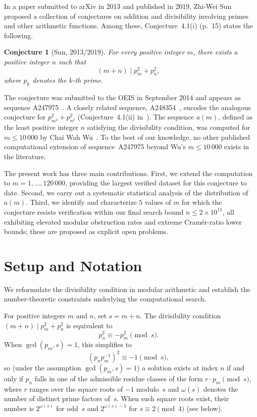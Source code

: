 \documentclass[pdflatex,sn-mathphys-num,Numbered]{sn-jnl}
\theoremstyle{thmstyleone}
\newtheorem{conjecture}[theorem]{Conjecture}
\theoremstyle{thmstylethree}
\theoremstyle{thmstyletwo}
\numberwithin{equation}{section}
\begin{document}
In a paper submitted to arXiv in 2013 and published in 2019,
Zhi-Wei Sun~\cite{Sun2019} proposed a collection of conjectures on
addition and divisibility involving primes and other arithmetic
functions.
Among these, Conjecture~4.1(i) (p.~15) states the following.

\begin{conjecture}[Sun, 2013/2019]\label{conj:sun}
	For every positive integer $m$, there exists a positive integer $n$
	such that
	\[
	(m + n) \mid p_m^2 + p_n^2,
	\]
	where $p_k$ denotes the $k$-th prime.
\end{conjecture}

The conjecture was submitted to the OEIS in September 2014 and appears
as sequence A247975~\cite{OEIS_A247975}.
A closely related sequence, A248354~\cite{OEIS_A248354}, encodes the
analogous conjecture for $p_{m^2}^2 + p_{n^2}^2$ (Conjecture~4.1(ii)
in~\cite{Sun2019}).
The sequence $a(m)$, defined as the least positive integer $n$
satisfying the divisibility condition, was computed for $m \leq 10\,000$
by Chai Wah Wu~\cite{WuOEIS}.
To the best of our knowledge, no other published computational
extension of sequence~A247975 beyond Wu's $m \leq 10\,000$ exists in
the literature.

The present work has three main contributions.
First, we extend the computation to $m = 1, \ldots, 120\,000$,
providing the largest verified dataset for this conjecture to date.
Second, we carry out a systematic statistical analysis of the
distribution of $a(m)$.
Third, we identify and characterize $5$ values of $m$ for which the
conjecture resists verification within our final search bound
$n \leq 2 \times 10^{11}$, all exhibiting elevated modular
obstruction rates and extreme Cram\'er-ratio lower bounds;
these are proposed as explicit open problems.

\section{Setup and Notation}
\label{sec:setup}

We reformulate the divisibility condition in modular arithmetic
and establish the number-theoretic constraints underlying the
computational search.

For positive integers $m$ and $n$, set $s = m + n$.
The divisibility condition $(m+n) \mid p_m^2 + p_n^2$ is equivalent to
\[
p_n^2 \equiv -p_m^2 \pmod{s}.
\]
When $\gcd(p_m, s) = 1$, this simplifies to
\[
\left( p_n p_m^{-1} \right)^2 \equiv -1 \pmod{s},
\]
so (under the assumption $\gcd(p_m, s) = 1$) a solution exists at
index $n$ if and only if $p_n$ falls in one of
the admissible residue classes of the form $r \cdot p_m \pmod{s}$,
where $r$ ranges over the square roots of $-1$ modulo~$s$
and $\omega(s)$ denotes the number of distinct prime factors of~$s$.
When such square roots exist, their number is $2^{\omega(s)}$ for
odd~$s$ and $2^{\omega(s)-1}$ for $s \equiv 2 \pmod{4}$
(see below).
\end{document}
